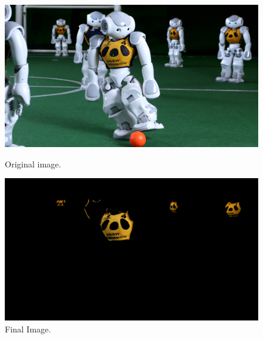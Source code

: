 \begin{figure}[h]
	\centering
	\begin{minipage}{0.45\textwidth}
		\centering
		\includegraphics[width=\linewidth]{images/source/original/5}
		\caption{Original image.}
		\label{fig:3a}
        \end{minipage}
        \hspace{0.05\textwidth}
        \begin{minipage}{0.45\textwidth}
        		\centering
		\includegraphics[width=\linewidth]{images/source/task3/1}
		\caption{Final Image.}
		\label{fig:3b}
        \end{minipage}
\end{figure}





